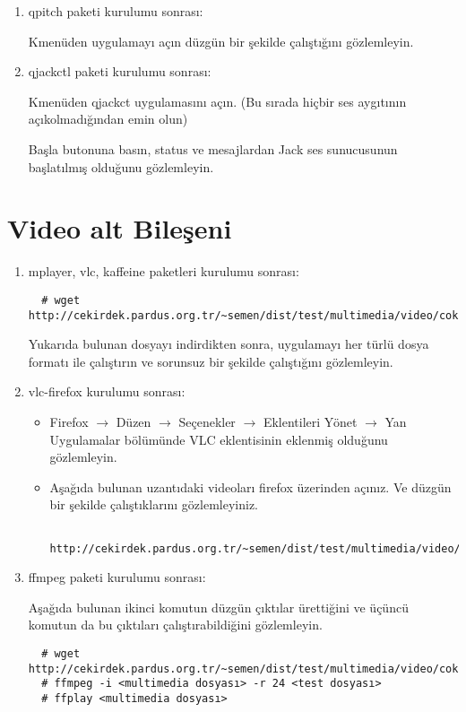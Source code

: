 \documentclass[a4paper,10pt]{article}
\begin{document}
\begin{enumerate}
\item qpitch paketi kurulumu sonrası:

Kmenüden uygulamayı açın düzgün bir şekilde çalıştığını gözlemleyin.

\item  qjackctl paketi kurulumu sonrası: 

Kmenüden qjackct uygulamasını açın. (Bu sırada hiçbir ses aygıtının açıkolmadığından emin olun)

Başla butonuna basın, status ve mesajlardan Jack ses sunucusunun başlatılmış olduğunu gözlemleyin.

\end{enumerate}

\section{Video alt Bileşeni}
\begin{enumerate}
 \item mplayer, vlc, kaffeine paketleri kurulumu sonrası:
 \begin{verbatim}
  # wget http://cekirdek.pardus.org.tr/~semen/dist/test/multimedia/video/cokluortam.tar
 \end{verbatim}
Yukarıda bulunan dosyayı indirdikten sonra, uygulamayı her türlü dosya formatı ile çalıştırın ve sorunsuz bir şekilde çalıştığını gözlemleyin.
 \item vlc-firefox kurulumu sonrası:
 \begin{itemize}
  \item Firefox $\rightarrow$ Düzen $\rightarrow$ Seçenekler $\rightarrow$ Eklentileri Yönet $\rightarrow$ Yan Uygulamalar bölümünde VLC eklentisinin eklenmiş olduğunu gözlemleyin.
  \item Aşağıda bulunan uzantıdaki videoları firefox üzerinden açınız. Ve düzgün bir şekilde çalıştıklarını gözlemleyiniz.
  \begin{verbatim}
  http://cekirdek.pardus.org.tr/~semen/dist/test/multimedia/video/cokluortam/  
  \end{verbatim}
 \end{itemize}
\item ffmpeg paketi kurulumu sonrası:
 
Aşağıda bulunan ikinci komutun düzgün çıktılar ürettiğini ve üçüncü komutun da bu çıktıları çalıştırabildiğini gözlemleyin.
\begin{verbatim}
  # wget http://cekirdek.pardus.org.tr/~semen/dist/test/multimedia/video/cokluortam.tar 
  # ffmpeg -i <multimedia dosyası> -r 24 <test dosyası>
  # ffplay <multimedia dosyası>
  \end{verbatim}
\end{enumerate}
\end{document}
